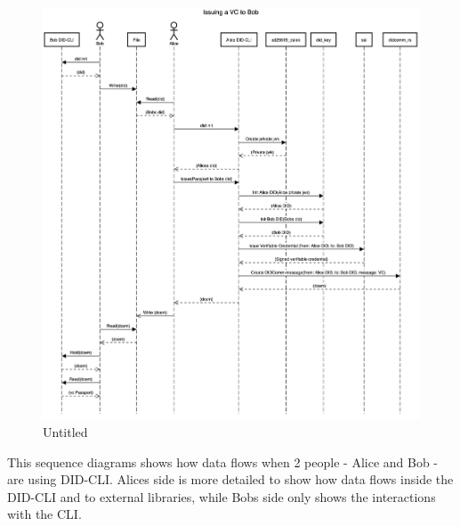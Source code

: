 \begin{figure}
\centering
\includegraphics{Architecture 1442df162dbe45f4a423ba37d3e12363/Untitled 10.png}
\caption{Untitled}
\end{figure}

This sequence diagrams shows how data flows when 2 people - Alice and
Bob - are using DID-CLI. Alices side is more detailed to show how data
flows inside the DID-CLI and to external libraries, while Bobs side only
shows the interactions with the CLI.

